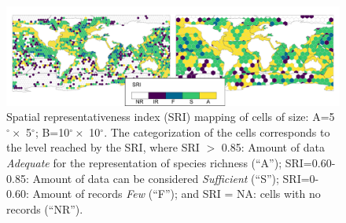 \documentclass[12pt,authoryear]{elsarticle}
\begin{document}


\begin{figure}[h]
\centering
\includegraphics[width=.99\textwidth]{Fig_AB}
\caption[]{Spatial representativeness index (SRI) mapping of cells of size: A=5$^\circ \times$ 5$^\circ$; B=10$^\circ \times$ 10$^\circ$. The categorization of the cells corresponds to the level reached by the SRI, where SRI $>$ 0.85: Amount of data \textit{Adequate} for the representation of species richness (``A''); SRI=0.60-0.85: Amount of data can be considered \textit{Sufficient} (``S''); SRI=0-0.60: Amount of records \textit{Few} (``F''); and SRI = NA: cells with no records (``NR'').
\label{fig:FigS1}}
\end{figure}
\end{document}
